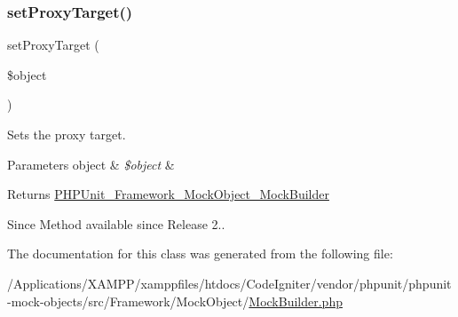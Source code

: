\subsubsection{\texorpdfstring{set\+Proxy\+Target()}{setProxyTarget()}}
{\footnotesize\ttfamily set\+Proxy\+Target (\begin{DoxyParamCaption}\item[{}]{\$object }\end{DoxyParamCaption})}

Sets the proxy target.


\begin{DoxyParams}[1]{Parameters}
object & {\em \$object} & \\
\hline
\end{DoxyParams}
\begin{DoxyReturn}{Returns}
\mbox{\hyperlink{class_p_h_p_unit___framework___mock_object___mock_builder}{P\+H\+P\+Unit\+\_\+\+Framework\+\_\+\+Mock\+Object\+\_\+\+Mock\+Builder}}
\end{DoxyReturn}
\begin{DoxySince}{Since}
Method available since Release 2.. 
\end{DoxySince}


The documentation for this class was generated from the following file\+:\begin{DoxyCompactItemize}
\item 
/\+Applications/\+X\+A\+M\+P\+P/xamppfiles/htdocs/\+Code\+Igniter/vendor/phpunit/phpunit-\/mock-\/objects/src/\+Framework/\+Mock\+Object/\mbox{\hyperlink{_mock_builder_8php}{Mock\+Builder.\+php}}\end{DoxyCompactItemize}
